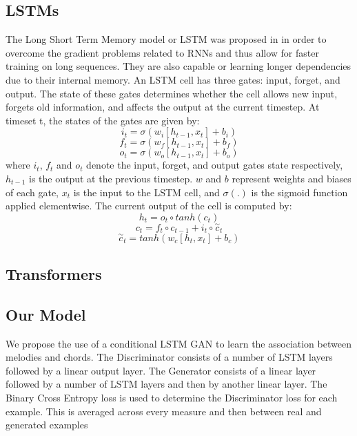 \subsection{LSTMs}

The Long Short Term Memory model or LSTM was proposed in \cite{LSTMs} in order to overcome the gradient problems related to RNNs and thus allow for faster training on long sequences.
They are also capable or learning longer dependencies due to their internal memory. An LSTM cell has three gates: input, forget, and output.
The state of these gates determines whether the cell allows new input, forgets old information, and affects the output at the current timestep.
At timeset t, the states of the gates are given by:
\begin{equation}
    i_t=\sigma(w_i[h_{t-1},x_t]+b_i)
\end{equation}
\begin{equation}
    f_t=\sigma(w_f[h_{t-1},x_t]+b_f)
\end{equation}
\begin{equation}
    o_t=\sigma(w_o[h_{t-1},x_t]+b_o)
\end{equation}
where $i_t$, $f_t$ and $o_t$ denote the input, forget, and output gates state respectively, $h_{t-1}$ is the output at the previous timestep.
$w$ and $b$ represent weights and biases of each gate, $x_t$ is the input to the LSTM cell, and $\sigma (.)$ is the sigmoid function applied elementwise.
The current output of the cell is computed by:
\begin{equation}
    h_t=o_t \circ tanh(c_t)
\end{equation}
\begin{equation}
    c_t = f_t \circ c_{t-1}+i_t \circ \overset{\sim}{c}_t
\end{equation}
\begin{equation}
    \overset{\sim}{c}_t = tanh(w_c[h_t,x_t]+b_c)
\end{equation}
\subsection{Transformers}

\subsection{Our Model}

We propose the use of a conditional LSTM GAN to learn the association between melodies and chords.
The Discriminator consists of a number of LSTM layers followed by a linear output layer.
The Generator consists of a linear layer followed by a number of LSTM layers and then by another linear layer.
The Binary Cross Entropy loss is used to determine the Discriminator loss for each example. This is averaged across every measure and then between real and generated examples
